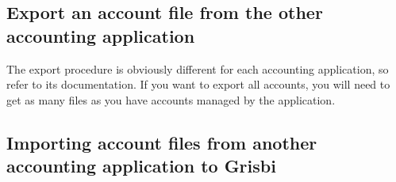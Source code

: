 

\subsection{Export an account file from the other accounting application\label{importexport-import-exportinit}}


The export procedure is obviously different for each accounting application, so refer to its documentation. If you want to export all accounts, you will need to get as many files as you have accounts managed by the application.


\subsection{Importing account files from another accounting application to Grisbi\label{importexport-import-importinit}}

